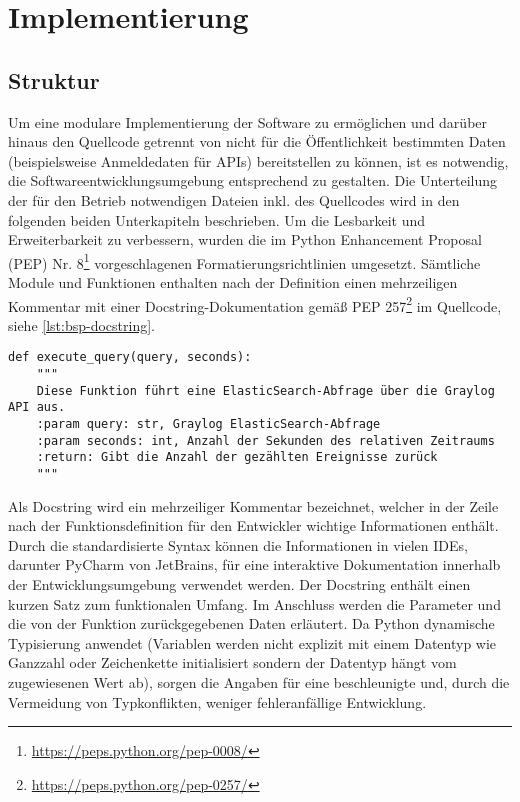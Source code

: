 \chapter{Implementierung}
\label{cha:implementierung}

\section{Struktur}

Um eine modulare Implementierung der Software zu ermöglichen und darüber hinaus den Quellcode getrennt von nicht für die Öffentlichkeit bestimmten Daten (beispielsweise Anmeldedaten für APIs) bereitstellen zu können, ist es notwendig, die Softwareentwicklungsumgebung entsprechend zu gestalten. Die Unterteilung der für den Betrieb notwendigen Dateien inkl. des Quellcodes wird in den folgenden beiden Unterkapiteln beschrieben. Um die Lesbarkeit und Erweiterbarkeit zu verbessern, wurden die im Python Enhancement Proposal (PEP) Nr. 8\footnote{\url{https://peps.python.org/pep-0008/}} vorgeschlagenen Formatierungsrichtlinien umgesetzt. Sämtliche Module und Funktionen enthalten nach der Definition einen mehrzeiligen Kommentar mit einer Docstring-Dokumentation gemäß PEP 257\footnote{\url{https://peps.python.org/pep-0257/}} im Quellcode, siehe \autoref{lst:bsp-docstring}.

\begin{lstlisting}[caption={Beispiel für einen Docstring.}, label=lst:bsp-docstring, numbers=none]
def execute_query(query, seconds):
    """
    Diese Funktion führt eine ElasticSearch-Abfrage über die Graylog API aus.
    :param query: str, Graylog ElasticSearch-Abfrage
    :param seconds: int, Anzahl der Sekunden des relativen Zeitraums
    :return: Gibt die Anzahl der gezählten Ereignisse zurück
    """
\end{lstlisting}

Als Docstring wird ein mehrzeiliger Kommentar bezeichnet, welcher in der Zeile nach der Funktionsdefinition für den Entwickler wichtige Informationen enthält. Durch die standardisierte Syntax können die Informationen in vielen IDEs, darunter PyCharm von JetBrains, für eine interaktive Dokumentation innerhalb der Entwicklungsumgebung verwendet werden. Der Docstring enthält einen kurzen Satz zum funktionalen Umfang. Im Anschluss werden die Parameter und die von der Funktion zurückgegebenen Daten erläutert. Da Python dynamische Typisierung anwendet (Variablen werden nicht explizit mit einem Datentyp wie Ganzzahl oder Zeichenkette initialisiert sondern der Datentyp hängt vom zugewiesenen Wert ab), sorgen die Angaben für eine beschleunigte und, durch die Vermeidung von Typkonflikten, weniger fehleranfällige Entwicklung.

